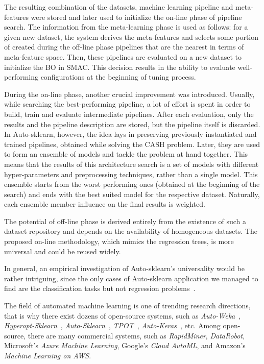 The resulting combination of the datasets, machine learning pipeline and meta-features were stored and later used to initialize the on-line phase of pipeline search.
The information from the meta-learning phase is used as follows: for a given new dataset, the system derives the meta-features and selects some portion of created during the off-line phase pipelines that are the nearest in terms of meta-feature space. Then, these pipelines are evaluated on a new dataset to initialize the BO in SMAC. This decision results in the ability to evaluate well-performing configurations at the beginning of tuning process.

During the on-line phase, another crucial improvement was introduced. 
Usually, while searching the best-performing pipeline, a lot of effort is spent in order to build, train and evaluate intermediate pipelines. After each evaluation, only the results and the pipeline description are stored, but the pipeline itself is discarded. In Auto-sklearn, however, the idea lays in preserving previously instantiated and trained pipelines, obtained while solving the CASH problem. Later, they are used to form an ensemble of models and tackle the problem at hand together. This means that the results of this architecture search is a set of models with different hyper-parameters and preprocessing techniques, rather than a single model. This ensemble starts from the worst performing ones (obtained at the beginning of the search) and ends with the best suited model for the respective dataset. Naturally, each ensemble member influence on the final results is weighted.

The potential of off-line phase is derived entirely from the existence of such a dataset repository and depends on the availability of homogeneous datasets. The proposed on-line methodology, which mimics the regression trees, is more universal and could be reused widely.

In general, an empirical investigation of Auto-sklearn's universality would be rather intriguing, since the only cases of Auto-sklearn application we managed to find are the classification tasks but not regression problems~\cite{feurer2015efficient,biedenkapp-ecai20}.

The field of automated machine learning is one of trending research directions, that is why there exist dozens of open-source systems, such as \textit{Auto-Weka}~\cite{thornton2013auto}, \textit{Hyperopt-Sklearn}~\cite{komer2014hyperopt}, \textit{Auto-Sklearn}~\cite{feurer2015efficient}, \textit{TPOT}~\cite{olson2019tpot}, \textit{Auto-Keras}~\cite{jin2019auto}, etc. Among open-source, there are many commercial systems, such as \textit{RapidMiner}, \textit{DataRobot}, Microsoft’s \textit{Azure Machine Learning}, Google’s \textit{Cloud AutoML}, and Amazon's \textit{Machine Learning on AWS}.


